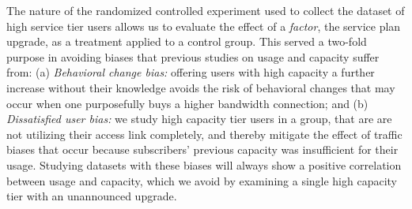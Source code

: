 The nature of the randomized controlled experiment used to collect the dataset 
of high service tier users allows us to evaluate the effect of a \emph{factor}, 
the service plan upgrade, as a treatment applied to a control group. This served 
a two-fold purpose in avoiding biases that previous studies on usage and 
capacity suffer from: (a) \emph{Behavioral change 
bias:} offering users with high capacity a further increase without their 
knowledge avoids the risk of behavioral changes that may occur when one 
purposefully buys a higher bandwidth connection; and (b) \emph{Dissatisfied 
user bias:} we study high capacity tier users in a \control{} group, that are 
are not utilizing their access link completely, and thereby mitigate the effect 
of traffic biases that occur because subscribers' previous capacity was 
insufficient for their usage. Studying datasets with these biases will always 
show a positive correlation between usage and capacity, which we avoid by 
examining a single high capacity tier with an unannounced upgrade.
